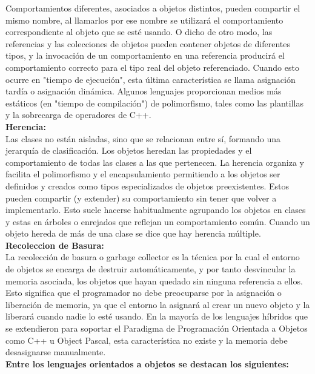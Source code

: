 \begin{enumerate}[1.]
Comportamientos diferentes, asociados a objetos distintos, pueden compartir el mismo nombre, al llamarlos por ese nombre se utilizará el comportamiento correspondiente al objeto que se esté usando. O dicho de otro modo, las referencias y las colecciones de objetos pueden contener objetos de diferentes tipos, y la invocación de un comportamiento en una referencia producirá el comportamiento correcto para el tipo real del objeto referenciado. Cuando esto ocurre en "tiempo de ejecución", esta última característica se llama asignación tardía o asignación dinámica. Algunos lenguajes proporcionan medios más estáticos (en "tiempo de compilación") de polimorfismo, tales como las plantillas y la sobrecarga de operadores de C++.\\

\textbf{Herencia:}\\

Las clases no están aisladas, sino que se relacionan entre sí, formando una jerarquía de clasificación. Los objetos heredan las propiedades y el comportamiento de todas las clases a las que pertenecen. La herencia organiza y facilita el polimorfismo y el encapsulamiento permitiendo a los objetos ser definidos y creados como tipos especializados de objetos preexistentes. Estos pueden compartir (y extender) su comportamiento sin tener que volver a implementarlo. Esto suele hacerse habitualmente agrupando los objetos en clases y estas en árboles o enrejados que reflejan un comportamiento común. Cuando un objeto hereda de más de una clase se dice que hay herencia múltiple.\\


\textbf{Recoleccion de Basura:}\\

La recolección de basura o garbage collector es la técnica por la cual el entorno de objetos se encarga de destruir automáticamente, y por tanto desvincular la memoria asociada, los objetos que hayan quedado sin ninguna referencia a ellos. Esto significa que el programador no debe preocuparse por la asignación o liberación de memoria, ya que el entorno la asignará al crear un nuevo objeto y la liberará cuando nadie lo esté usando. En la mayoría de los lenguajes híbridos que se extendieron para soportar el Paradigma de Programación Orientada a Objetos como C++ u Object Pascal, esta característica no existe y la memoria debe desasignarse manualmente.\\


\textbf{Entre los lenguajes orientados a objetos se destacan los siguientes:}\\


\end{enumerate}
